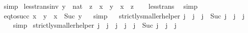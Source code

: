 \begin{isabellebody}
\endisadelimproof
%
\isatagproof
{}\isamarkupfalse%
\ simp%
\endisatagproof
{\isafoldproof}%
%
\isadelimproof
\isanewline
%
\endisadelimproof
\isanewline
{}\isamarkupfalse%
\ less{\isacharunderscore}{\kern0pt}trans{\isacharunderscore}{\kern0pt}inv{\isacharcolon}{\kern0pt}\ {\isachardoublequoteopen}{\isacharparenleft}{\kern0pt}y\ {\isacharcolon}{\kern0pt}{\isacharcolon}{\kern0pt}\ nat{\isacharparenright}{\kern0pt}\ {\isacharless}{\kern0pt}\ z\ {\isasymLongrightarrow}\ x\ {\isacharless}{\kern0pt}\ y\ {\isasymLongrightarrow}\ x\ {\isacharless}{\kern0pt}\ z{\isachardoublequoteclose}\isanewline
%
\isadelimproof
\ \ %
\endisadelimproof
%
\isatagproof
{}\isamarkupfalse%
\ less{\isacharunderscore}{\kern0pt}trans\ \isamarkupfalse%
\ simp%
\endisatagproof
{\isafoldproof}%
%
\isadelimproof
\isanewline
%
\endisadelimproof
\isanewline
{}\isamarkupfalse%
\ eq{\isacharunderscore}{\kern0pt}to{\isacharunderscore}{\kern0pt}succ{\isacharcolon}{\kern0pt}\ {\isachardoublequoteopen}x\ {\isacharequal}{\kern0pt}\ y\ {\isasymLongrightarrow}\ x\ {\isacharless}{\kern0pt}\ {\isacharparenleft}{\kern0pt}Suc\ y{\isacharparenright}{\kern0pt}{\isachardoublequoteclose}%
\isadelimproof
\ %
\endisadelimproof
%
\isatagproof
{}\isamarkupfalse%
\ simp%
\endisatagproof
{\isafoldproof}%
%
\isadelimproof
%
\endisadelimproof
\ \isanewline
\isanewline
{}\isamarkupfalse%
\ strictly{\isacharunderscore}{\kern0pt}smaller{\isacharunderscore}{\kern0pt}helper{}{\isacharcolon}{\kern0pt}\ {\isachardoublequoteopen}j{\isacharprime}{\kern0pt}{\isacharprime}{\kern0pt}\ {\isacharless}{\kern0pt}\ j{\isacharprime}{\kern0pt}\ {\isasymLongrightarrow}\ j\ {\isacharequal}{\kern0pt}\ Suc\ j{\isacharprime}{\kern0pt}\ {\isasymLongrightarrow}\ j{\isacharprime}{\kern0pt}{\isacharprime}{\kern0pt}\ {\isacharless}{\kern0pt}\ j{\isachardoublequoteclose}\isanewline
%
\isadelimproof
\ \ %
\endisadelimproof
%
\isatagproof
{}\isamarkupfalse%
\ simp%
\endisatagproof
{\isafoldproof}%
%
\isadelimproof
\isanewline
%
\endisadelimproof
\isanewline
{}\isamarkupfalse%
\ strictly{\isacharunderscore}{\kern0pt}smaller{\isacharunderscore}{\kern0pt}helper{}{\isacharcolon}{\kern0pt}\ {\isachardoublequoteopen}j{\isacharprime}{\kern0pt}{\isacharprime}{\kern0pt}\ {\isacharless}{\kern0pt}\ j{\isacharprime}{\kern0pt}\ {\isasymLongrightarrow}\ j{\isacharprime}{\kern0pt}{\isacharprime}{\kern0pt}{\isacharprime}{\kern0pt}\ {\isacharless}{\kern0pt}\ j{\isacharprime}{\kern0pt}{\isacharprime}{\kern0pt}\ {\isasymLongrightarrow}\ j\ {\isacharequal}{\kern0pt}\ Suc\ j{\isacharprime}{\kern0pt}\ {\isasymLongrightarrow}\ j{\isacharprime}{\kern0pt}{\isacharprime}{\kern0pt}{\isacharprime}{\kern0pt}\ {\isacharless}{\kern0pt}\ j{\isachardoublequoteclose}\isanewline

\end{isabellebody}
